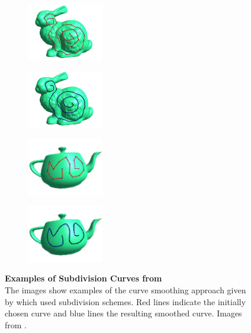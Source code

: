 \documentclass{stdlocal}
\begin{document}
\begin{figure}[t]
  \centering
  \begin{subfigure}[b]{0.23\linewidth}
    \centering
    \includegraphics[height=2.5cm]{images/morera2008-1.png}
  \end{subfigure}
  \begin{subfigure}[b]{0.23\linewidth}
    \centering
    \includegraphics[height=2.5cm]{images/morera2008-2.png}
  \end{subfigure}
  \begin{subfigure}[b]{0.25\linewidth}
    \centering
    \includegraphics[height=2.5cm]{images/morera2008-3.png}
  \end{subfigure}
  \begin{subfigure}[b]{0.25\linewidth}
    \centering
    \includegraphics[height=2.5cm]{images/morera2008-4.png}
  \end{subfigure}
  \caption[Examples of Subdivision Curves from \textcite{morera2008}]{%
    \textbf{Examples of Subdivision Curves from \textcite{morera2008}}\\
    The images show examples of the curve smoothing approach given by \textcite{morera2008} which used subdivision schemes.
    Red lines indicate the initially chosen curve and blue lines the resulting smoothed curve.
    Images from \textcite{morera2008}.
  }
  \label{fig:morera2008}
\end{figure}
\end{document}
